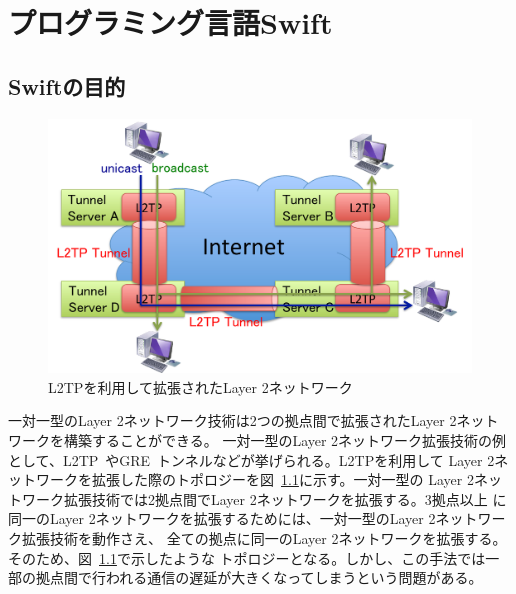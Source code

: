 \chapter{プログラミング言語Swift}
\label{rw}

\section{Swiftの目的}
\label{rw:pointtopoint}

\begin{figure}
	\begin{center}
		\includegraphics[scale=0.60]{./img/l2tptopology}
		\caption{L2TPを利用して拡張されたLayer 2ネットワーク}
		\label{img:l2tptopology}
	\end{center}
\end{figure}

一対一型のLayer 2ネットワーク技術は2つの拠点間で拡張されたLayer 2ネットワークを構築することができる。
一対一型のLayer 2ネットワーク拡張技術の例として、L2TP~\cite{rfc:l2tp}やGRE~\cite{rfc:gre}トンネルなどが挙げられる。L2TPを利用して
Layer 2ネットワークを拡張した際のトポロジーを図~\ref{img:l2tptopology}に示す。一対一型の
Layer 2ネットワーク拡張技術では2拠点間でLayer 2ネットワークを拡張する。3拠点以上
に同一のLayer 2ネットワークを拡張するためには、一対一型のLayer 2ネットワーク拡張技術を動作さえ、
全ての拠点に同一のLayer 2ネットワークを拡張する。そのため、図~\ref{img:l2tptopology}で示したような
トポロジーとなる。しかし、この手法では一部の拠点間で行われる通信の遅延が大きくなってしまうという問題がある。

